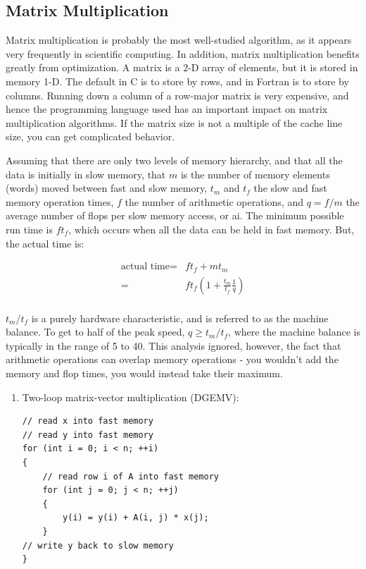 \documentclass[10pt]{article}
\begin{document}
\begin{flushleft}
\subsection{Matrix Multiplication}

Matrix multiplication is probably the most well-studied algorithm, as it appears very frequently in scientific computing. In addition, matrix multiplication benefits greatly from optimization. A matrix is a 2-D array of elements, but it is stored in memory 1-D. The default in C is to store by rows, and in Fortran is to store by columns. Running down a column of a row-major matrix is very expensive, and hence the programming language used has an important impact on matrix multiplication algorithms. If the matrix size is not a multiple of the cache line size, you can get complicated behavior.

Assuming that there are only two levels of memory hierarchy, and that all the data is initially in slow memory, that \(m\) is the number of memory elements (words) moved between fast and slow memory, \(t_m\) and \(t_f\) the slow and fast memory operation times, \(f\) the number of arithmetic operations, and \(q=f/m\) the average number of flops per slow memory access, or \gls{ai}. The minimum possible run time is \(ft_f\), which occurs when all the data can be held in fast memory. But, the actual time is:

\begin{equation}
\begin{aligned}
\textrm{actual time}=& ft_f+mt_m\\
=& ft_f\left(1+\frac{t_m}{t_f}\frac{1}{q}\right)\\
\end{aligned}
\end{equation}

\(t_m/t_f\) is a purely hardware characteristic, and is referred to as the machine balance. To get to half of the peak speed, \(q\geq t_m/t_f\), where the machine balance is typically in the range of 5 to 40. This analysis ignored, however, the fact that arithmetic operations can overlap memory operations - you wouldn't add the memory and flop times, you would instead take their maximum.

\begin{enumerate}
\item Two-loop matrix-vector multiplication (DGEMV):

\begin{lstlisting}
// read x into fast memory
// read y into fast memory
for (int i = 0; i < n; ++i)
{
	// read row i of A into fast memory
	for (int j = 0; j < n; ++j)
	{
		y(i) = y(i) + A(i, j) * x(j);
	}
// write y back to slow memory
}
\end{lstlisting}


\end{enumerate}
\end{flushleft}
\end{document}
